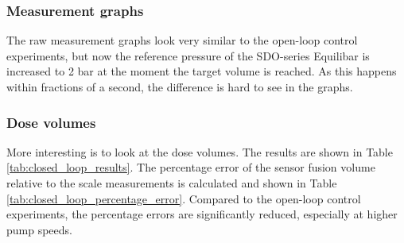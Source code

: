 \documentclass[12pt,a4paper]{article}
\begin{document}
\subsubsection{Measurement graphs}
The raw measurement graphs look very similar to the open-loop control experiments, but now the reference pressure of the SDO-series Equilibar is increased to 2 bar at the moment the target volume is reached. As this happens within fractions of a second, the difference is hard to see in the graphs. 

\subsubsection{Dose volumes}
More interesting is to look at the dose volumes. The results are shown in Table \ref{tab:closed_loop_results}. The percentage error of the sensor fusion volume relative to the scale measurements is calculated and shown in Table \ref{tab:closed_loop_percentage_error}. Compared to the open-loop control experiments, the percentage errors are significantly reduced, especially at higher pump speeds.
\end{document}
